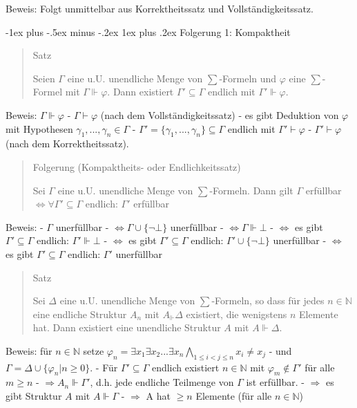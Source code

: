 \documentclass[a4paper]{article}
\makeatletter
\renewcommand{\subsubsection}{\@startsection{subsubsection}{3}{0mm}%
                {-1ex plus -.5ex minus -.2ex}%
                {1ex plus .2ex}%
                {\normalfont\small\bfseries}}
\makeatother
\begin{document}
\begin{multicols}{3}
  Beweis: Folgt unmittelbar aus Korrektheitssatz und Vollständigkeitssatz.

  \subsubsection{Folgerung 1: Kompaktheit}\label{folgerung-1-kompaktheit}

  \begin{quote}
    Satz

    Seien $\Gamma$ eine u.U. unendliche Menge von $\sum$-Formeln und
    $\varphi$ eine $\sum$-Formel mit $\Gamma\Vdash\varphi$. Dann existiert
    $\Gamma'\subseteq\Gamma$ endlich mit $\Gamma'\Vdash\varphi$.
  \end{quote}

  Beweis: $\Gamma\Vdash\varphi$ - $\Gamma\vdash\varphi$ (nach dem
  Vollständigkeitssatz) - es gibt Deduktion von $\varphi$ mit Hypothesen
  $\gamma_1,...,\gamma_n\in\Gamma$ -
  $\Gamma'=\{\gamma_1,...,\gamma_n\}\subseteq\Gamma$ endlich mit
  $\Gamma'\vdash\varphi$ - $\Gamma'\vdash\varphi$ (nach dem
  Korrektheitssatz).

  \begin{quote}
    Folgerung (Kompaktheits- oder Endlichkeitssatz)

    Sei $\Gamma$ eine u.U. unendliche Menge von $\sum$-Formeln. Dann gilt
    $\Gamma$ erfüllbar $\Leftrightarrow \forall\Gamma'\subseteq\Gamma$
    endlich: $\Gamma'$ erfüllbar
  \end{quote}

  Beweis: - $\Gamma$ unerfüllbar -
  $\Leftrightarrow \Gamma\cup\{\lnot\bot\}$ unerfüllbar -
  $\Leftrightarrow \Gamma\Vdash\bot$ - $\Leftrightarrow$ es gibt
  $\Gamma'\subseteq\Gamma$ endlich: $\Gamma'\Vdash\bot$ -
  $\Leftrightarrow$ es gibt $\Gamma'\subseteq\Gamma$ endlich:
  $\Gamma'\cup\{\lnot\bot\}$ unerfüllbar - $\Leftrightarrow$ es gibt
  $\Gamma'\subseteq\Gamma$ endlich: $\Gamma'$ unerfüllbar

  \begin{quote}
    Satz

    Sei $\Delta$ eine u.U. unendliche Menge von $\sum$-Formeln, so dass für
    jedes $n\in\mathbb{N}$ eine endliche Struktur $A_n$ mit $A_\Vdash\Delta$
    existiert, die wenigstens $n$ Elemente hat. Dann existiert eine
    unendliche Struktur $A$ mit $A\Vdash\Delta$.
  \end{quote}

  Beweis: für $n\in\mathbb{N}$ setze
  $\varphi_n=\exists x_1 \exists x_2 ...\exists x_n \bigwedge_{1\leq i< j \leq n} x_i \not= x_j$
  - und $\Gamma =\Delta\cup\{\varphi_n | n\geq 0\}$. - Für
  $\Gamma'\subseteq\Gamma$ endlich existiert $n\in\mathbb{N}$ mit
  $\varphi_m\not\in\Gamma'$ für alle $m\geq n$ -
  $\Rightarrow A_n\Vdash\Gamma'$, d.h. jede endliche Teilmenge von
  $\Gamma$ ist erfüllbar. - $\Rightarrow$ es gibt Struktur $A$ mit
  $A\Vdash\Gamma$ - $\Rightarrow$ A hat $\geq n$ Elemente (für alle
  $n\in\mathbb{N}$)


\end{multicols}
\end{document}
